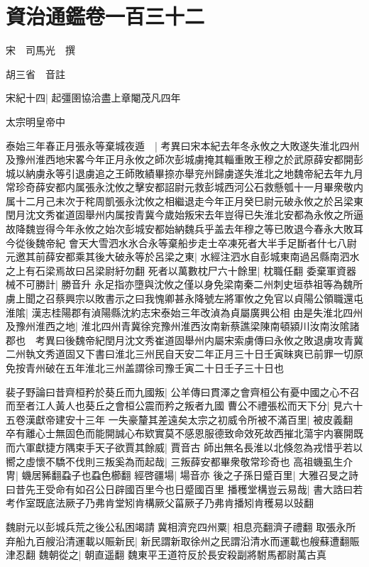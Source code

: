 \chapter{資治通鑑卷一百三十二}
宋　司馬光　撰

胡三省　音註

宋紀十四|{
	起彊圉協洽盡上章閹茂凡四年}


太宗明皇帝中

泰始三年春正月張永等棄城夜遁　|{
	考異曰宋本紀去年冬永攸之大敗遂失淮北四州及豫州淮西地宋畧今年正月永攸之師次彭城虜掩其輜重敗王穆之於武原薛安都開彭城以納虜永等引退虜追之王師敗績畢捺亦舉兖州歸虜遂失淮北之地魏帝紀去年九月常珍奇薛安都内属張永沈攸之擊安都詔尉元救彭城西河公石救懸瓠十一月畢衆敬内属十二月己未次于秺周凱張永沈攸之相繼退走今年正月癸巳尉元破永攸之於呂梁東閏月沈文秀崔道固舉州内属按青冀今歲始叛宋去年豈得已失淮北安都為永攸之所逼故降魏豈得今年永攸之始次彭城安都始納魏兵乎盖去年穆之等已敗退今春永大敗耳今從後魏帝紀}
會天大雪泗水氷合永等棄船步走士卒凍死者大半手足斷者什七八尉元邀其前薛安都乘其後大破永等於呂梁之東|{
	水經注泗水自彭城東南過呂縣南泗水之上有石梁焉故曰呂梁尉紆勿翻}
死者以萬數枕尸六十餘里|{
	枕職任翻}
委棄軍資器械不可勝計|{
	勝音升}
永足指亦墮與沈攸之僅以身免梁南秦二州刺史垣恭祖等為魏所虜上聞之召蔡興宗以敗書示之曰我愧卿甚永降號左將軍攸之免官以貞陽公領職還屯淮隂|{
	漢志桂陽郡有湞陽縣沈約志宋泰始三年改湞為貞屬廣興公相}
由是失淮北四州及豫州淮西之地|{
	淮北四州青冀徐兖豫州淮西汝南新蔡譙梁陳南頓潁川汝南汝隂諸郡也　考異曰後魏帝紀閏月沈文秀崔道固舉州内屬宋索虜傳曰永攸之敗退虜攻青冀二州執文秀道固又下書曰淮北三州民自天安二年正月三十日壬寅昧爽已前罪一切原免按青州破在五年淮北三州盖謂徐司豫壬寅二十日壬子三十日也}


裴子野論曰昔齊桓矜於葵丘而九國叛|{
	公羊傳曰貫澤之會齊桓公有憂中國之心不召而至者江人黃人也葵丘之會桓公震而矜之叛者九國}
曹公不禮張松而天下分|{
	見六十五卷漢獻帝建安十三年}
一失豪釐其差遠矣太宗之初威令所被不滿百里|{
	被皮義翻}
卒有離心士無固色而能開誠心布欵實莫不感恩服德致命效死故西摧北蕩宇内褰開既而六軍獻捷方隅束手天子欲賈其餘威|{
	賈音古}
師出無名長淮以北倏忽為戎惜乎若以嚮之虛懷不驕不伐則三叛奚為而起哉|{
	三叛薛安都畢衆敬常珍奇也}
高祖蟣虱生介冑|{
	蟣居豨翻蝨子也蝨色櫛翻}
經啓疆場|{
	場音亦}
後之子孫日蹙百里|{
	大雅召旻之詩曰昔先王受命有如召公日辟國百里今也日蹙國百里}
播穫堂構豈云易哉|{
	書大誥曰若考作室既底法厥子乃弗肯堂矧肯構厥父菑厥子乃弗肯播矧肯穫易以䜴翻}


魏尉元以彭城兵荒之後公私困竭請冀相濟兖四州粟|{
	相息亮翻濟子禮翻}
取張永所弃船九百艘沿清運載以賑新民|{
	新民謂新取徐州之民謂沿清水而運載也艘蘇遭翻賑津忍翻}
魏朝從之|{
	朝直遥翻}
魏東平王道符反於長安殺副將駙馬都尉萬古真

